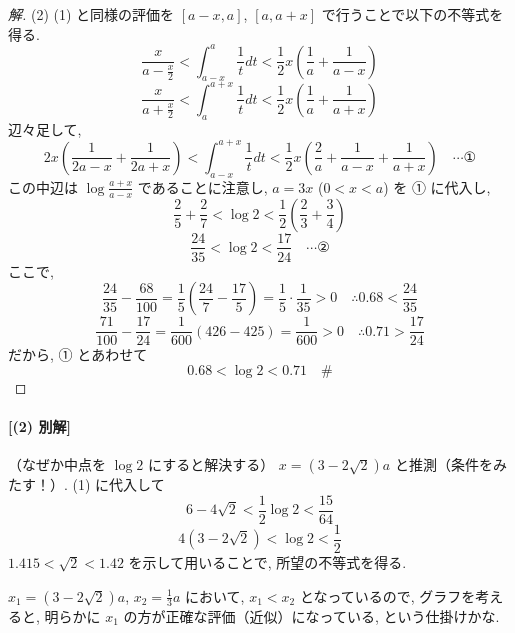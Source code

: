 \documentclass[../main.tex]{subfiles}
\begin{document}
\begin{proof}[解]
  (2) (1) と同様の評価を $[a-x, a]$, $[a, a+x]$ で行うことで以下の不等式を得る.
  \[
    \frac{x}{a - \frac{x}{2}} < \int_{a-x}^a \frac{1}{t} dt < \frac{1}{2} x \left( \frac{1}{a} + \frac{1}{a-x} \right)
  \]
  \[
    \frac{x}{a + \frac{x}{2}} < \int_a^{a+x} \frac{1}{t} dt < \frac{1}{2} x \left( \frac{1}{a} + \frac{1}{a+x} \right)
  \]
  辺々足して,
  \[
    2x \left( \frac{1}{2a-x} + \frac{1}{2a+x} \right) < \int_{a-x}^{a+x} \frac{1}{t} dt < \frac{1}{2} x \left( \frac{2}{a} + \frac{1}{a-x} + \frac{1}{a+x} \right) \quad \cdots ①
  \]
  この中辺は $\log \frac{a+x}{a-x}$ であることに注意し, $a=3x$ ($0 < x < a$) を ① に代入し,
  \[
    \frac{2}{5} + \frac{2}{7} < \log 2 < \frac{1}{2} \left( \frac{2}{3} + \frac{3}{4} \right)
  \]
  \[
    \frac{24}{35} < \log 2 < \frac{17}{24} \quad \cdots ②
  \]
  ここで,
  \[
    \frac{24}{35} - \frac{68}{100} = \frac{1}{5} \left( \frac{24}{7} - \frac{17}{5} \right) = \frac{1}{5} \cdot \frac{1}{35} > 0 \quad \therefore 0.68 < \frac{24}{35}
  \]
  \[
    \frac{71}{100} - \frac{17}{24} = \frac{1}{600} (426 - 425) = \frac{1}{600} > 0 \quad \therefore 0.71 > \frac{17}{24}
  \]
  だから, ① とあわせて
  \[
    0.68 < \log 2 < 0.71 \quad \text{\#}
  \]
\end{proof}

\paragraph{[(2) 別解]}
（なぜか中点を $\log 2$ にすると解決する）
$x = (3 - 2\sqrt{2})a$ と推測（条件をみたす！）. (1) に代入して
\[
  6 - 4\sqrt{2} < \frac{1}{2} \log 2 < \frac{15}{64}
\]
\[
  4(3 - 2\sqrt{2}) < \log 2 < \frac{1}{2}
\]
$1.415 < \sqrt{2} < 1.42$ を示して用いることで, 所望の不等式を得る.

\begin{center}
\end{center}
$x_1 = (3-2\sqrt{2})a$, $x_2 = \frac{1}{3}a$ において,
$x_1 < x_2$ となっているので, グラフを考えると, 明らかに $x_1$ の方が正確な評価（近似）になっている, という仕掛けかな.
\end{document}
